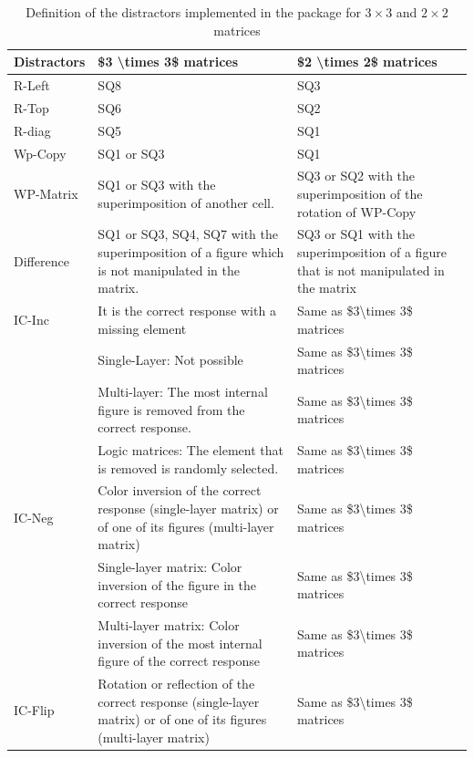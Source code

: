 \begin{table}

\caption{\label{tab:dist-types-tab-static}Definition of the distractors implemented in the  package for $3 \times 3$ and $2 \times 2$ matrices}
\centering
\begin{tabular}[t]{>{\raggedright\arraybackslash}p{3cm}|>{\raggedright\arraybackslash}p{5cm}|>{\raggedright\arraybackslash}p{5cm}}
\hline
Distractors & \$3 \textbackslash{}times 3\$ matrices & \$2 \textbackslash{}times 2\$ matrices\\
\hline
R-Left & SQ8 & SQ3\\
\hline
R-Top & SQ6 & SQ2\\
\hline
R-diag & SQ5 & SQ1\\
\hline
Wp-Copy & SQ1 or SQ3 & SQ1\\
\hline
WP-Matrix & SQ1 or SQ3 with the superimposition of another cell. & SQ3 or SQ2 with the superimposition of the rotation of WP-Copy\\
\hline
Difference & SQ1 or SQ3, SQ4, SQ7 with the superimposition of a figure which is not manipulated in the matrix. & SQ3 or SQ1 with the superimposition of a figure that is not manipulated in the matrix\\
\hline
IC-Inc & It is the correct response with a missing element & Same as \$3\textbackslash{}times 3\$ matrices\\
\hline
 & Single-Layer: Not possible & Same as \$3\textbackslash{}times 3\$ matrices\\
\hline
 & Multi-layer: The most internal figure is removed from the correct response. & Same as \$3\textbackslash{}times 3\$ matrices\\
\hline
 & Logic matrices: The element that is removed is randomly selected. & Same as \$3\textbackslash{}times 3\$ matrices\\
\hline
IC-Neg & Color inversion of the correct response (single-layer matrix) or of one of its figures (multi-layer matrix) & Same as \$3\textbackslash{}times 3\$ matrices\\
\hline
 & Single-layer matrix:     Color inversion of the figure in the correct response & Same as \$3\textbackslash{}times 3\$ matrices\\
\hline
 & Multi-layer matrix: Color inversion of the most internal figure of the correct response & Same as \$3\textbackslash{}times 3\$ matrices\\
\hline
IC-Flip & Rotation or reflection of the correct response (single-layer matrix) or of one of its figures (multi-layer matrix) & Same as \$3\textbackslash{}times 3\$ matrices\\

\end{tabular}
\end{table}
